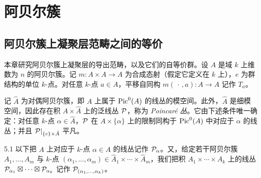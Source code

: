
\chapter{阿贝尔簇}
\section{阿贝尔簇上凝聚层范畴之间的等价}


本章研究阿贝尔簇上凝聚层的导出范畴，以及它们的自等价群。设 $A$ 是域 $k$ 上维数为 $n$ 的阿贝尔簇。记 $m:A\times A\to A$ 为合成态射（假定它定义在 $k$ 上），$e$ 为群结构的单位 $k$-点。对任意 $k$-点 $a\in A$，平移自同构 $m(\,\cdot\,,a):A\to A$ 记作 $T_a$。

记 $\hat A$ 为对偶阿贝尔簇，即 $A$ 上属于 $\operatorname{Pic}^0(A)$ 的线丛的模空间。此外，$\hat A$ 是细模空间，因此存在积 $A\times\hat A$ 上的泛线丛 $\mathcal{P}$，称为 \emph{Poincaré 丛}。它由下述条件唯一确定：对任意 $k$-点 $\alpha\in\hat A$，$\mathcal{P}$ 在 $A\times\{\alpha\}$ 上的限制同构于 $\operatorname{Pic}^0(A)$ 中对应于 $\alpha$ 的线丛；并且 $\mathcal{P}|_{\{e\}\times\hat A}$ 平凡。


\begin{definition}{5.1}
以下把 $A$ 上对应于 $k$-点 $\alpha\in\hat A$ 的线丛记作 $\mathcal{P}_\alpha$。又，给定若干阿贝尔簇 $A_1,\dots,A_m$ 与 $k$-点 $(\alpha_1,\dots,\alpha_m)\in\hat A_1\times\cdots\times\hat A_m$，我们把积 $A_1\times\cdots\times A_k$ 上的线丛 $\mathcal{P}_{\alpha_1}\boxtimes\cdots\boxtimes\mathcal{P}_{\alpha_k}$ 记作 $\mathcal{P}_{(\alpha_1,\dots,\alpha_k)}$。
\end{definition}

